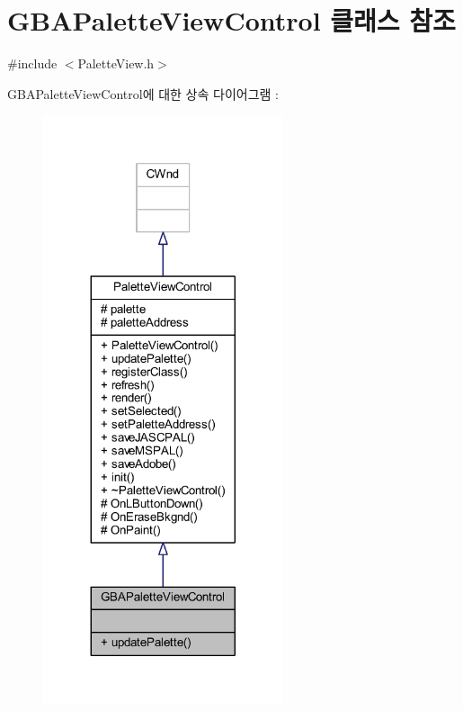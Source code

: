 \hypertarget{class_g_b_a_palette_view_control}{}\section{G\+B\+A\+Palette\+View\+Control 클래스 참조}
\label{class_g_b_a_palette_view_control}


{\ttfamily \#include $<$Palette\+View.\+h$>$}



G\+B\+A\+Palette\+View\+Control에 대한 상속 다이어그램 \+: \nopagebreak
\begin{figure}[H]
\begin{center}
\leavevmode
\includegraphics[width=200pt]{class_g_b_a_palette_view_control__inherit__graph}
\end{center}
\end{figure}


